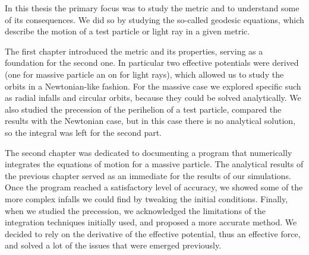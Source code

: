 
In this thesis the primary focus was to study the \Sh metric and to understand
some of its consequences.
We did so by studying the so-called geodesic equations, which describe the
motion of a test particle or light ray in a given metric.

The first chapter introduced the \Sh metric and its properties, serving as a
foundation for the second one.
In particular two effective potentials were derived (one for massive particle an
on for light rays), which allowed us to study the orbits in a Newtonian-like
fashion.
For the massive case we explored specific   such as radial infalls and circular
orbits, because they could be solved analytically.
We also studied the precession of the perihelion of a test particle, compared
the results with the Newtonian case, but in this case there is no analytical
solution, so the integral was left for the second part.

The second chapter was dedicated to documenting a program that numerically
integrates the equations of motion for a massive particle.
The analytical results of the previous chapter served as an immediate for the
results of our simulations.
Once the program reached a satisfactory level of accuracy, we showed some of the
more complex infalls we could find by tweaking the initial conditions.
Finally, when we studied the precession, we acknowledged the limitations of the
integration techniques initially used, and proposed a more accurate method. 
We decided to rely on the derivative of the effective potential, thus an
effective force, and solved a lot of the issues that were emerged previously.

